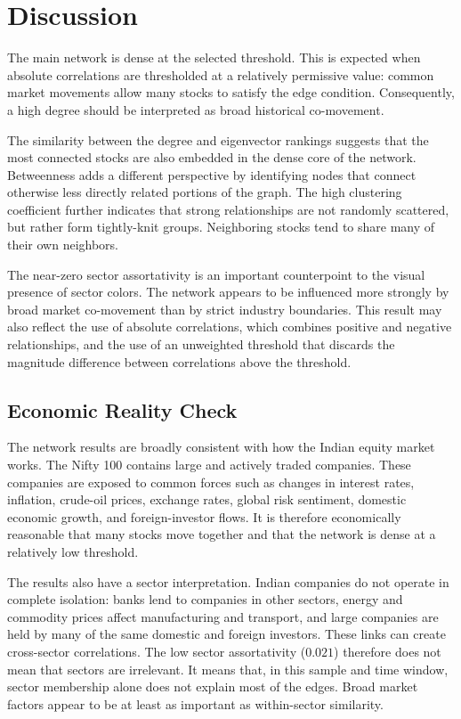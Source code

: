 \documentclass[12pt]{article}
\numberwithin{equation}{section}
\begin{document}
\section{Discussion}
The main network is dense at the selected threshold. This is expected when
absolute correlations are thresholded at a relatively permissive value:
common market movements allow many stocks to satisfy the edge condition.
Consequently, a high degree should be interpreted as broad historical
co-movement.

The similarity between the degree and eigenvector rankings suggests that the
most connected stocks are also embedded in the dense core of the network.
Betweenness adds a different perspective by identifying nodes that connect
otherwise less directly related portions of the graph. The high clustering
coefficient further indicates that strong relationships are not randomly
scattered, but rather form tightly-knit groups. Neighboring stocks tend to share many of their own neighbors.

The near-zero sector assortativity is an important counterpoint to the visual
presence of sector colors. The network appears to be influenced more strongly
by broad market co-movement than by strict industry boundaries. This result
may also reflect the use of absolute correlations, which combines positive
and negative relationships, and the use of an unweighted threshold that
discards the magnitude difference between correlations above the threshold.

\subsection{Economic Reality Check}
The network results are broadly consistent with how the Indian equity market
works. The Nifty 100 contains large
and actively traded companies. These companies are exposed to common forces
such as changes in interest rates, inflation, crude-oil prices, exchange rates,
global risk sentiment, domestic economic growth, and foreign-investor flows.
It is therefore economically reasonable that many stocks move together and
that the network is dense at a relatively low threshold.

The results also have a sector interpretation. Indian companies do
not operate in complete isolation: banks lend to companies in other sectors,
energy and commodity prices affect manufacturing and transport, and large
companies are held by many of the same domestic and foreign investors. These
links can create cross-sector correlations. The low sector assortativity
($0.021$) therefore does not mean that sectors are irrelevant. It means that,
in this sample and time window, sector membership alone does not explain most
of the edges. Broad market factors appear to be at least as important as
within-sector similarity.
\end{document}
